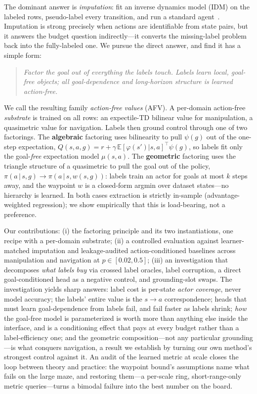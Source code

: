 \documentclass{article}
\newcommand{\E}{\mathbb{E}}
\theoremstyle{plain}
\theoremstyle{definition}
\begin{document}
The dominant answer is \emph{imputation}: fit an inverse dynamics model (IDM) on the labeled rows, pseudo-label every transition, and run a standard agent~\citep{ssorl}. Imputation is strong precisely when actions are identifiable from state pairs, but it answers the budget question indirectly---it converts the missing-label problem back into the fully-labeled one. We pursue the direct answer, and find it has a simple form:

\begin{quote}
\emph{Factor the goal out of everything the labels touch. Labels learn local, goal-free objects; all goal-dependence and long-horizon structure is learned action-free.}
\end{quote}

We call the resulting family \emph{action-free values} (AFV). A per-domain action-free \emph{substrate} is trained on all rows: an expectile-TD bilinear value for manipulation, a quasimetric value for navigation. Labels then ground control through one of two factorings. The \textbf{algebraic} factoring uses bilinearity to pull $\psi(g)$ out of the one-step expectation, $Q(s,a,g)=r+\gamma\,\E[\varphi(s')|s,a]^{\!\top}\psi(g)$, so labels fit only the goal-\emph{free} expectation model $\mu(s,a)$. The \textbf{geometric} factoring uses the triangle structure of a quasimetric to pull the goal out of the policy, $\pi(a\,|\,s,g)\rightarrow\pi(a\,|\,s,w(s,g))$: labels train an actor for goals at most $k$ steps away, and the waypoint $w$ is a closed-form argmin over dataset states---no hierarchy is learned. In both cases extraction is strictly in-sample (advantage-weighted regression); we show empirically that this is load-bearing, not a preference.

Our contributions: (i) the factoring principle and its two instantiations, one recipe with a per-domain substrate; (ii) a controlled evaluation against learner-matched imputation and leakage-audited action-conditioned baselines across manipulation and navigation at $p\in[0.02,0.5]$; (iii) an investigation that decomposes \emph{what labels buy} via crossed label oracles, label corruption, a direct goal-conditioned head as a negative control, and grounding-slot swaps. The investigation yields sharp answers: label cost is per-state \emph{actor coverage}, never model accuracy; the labels' entire value is the $s\!\to\!a$ correspondence; heads that must learn goal-dependence from labels fail, and fail faster as labels shrink; \emph{how} the goal-free model is parameterized is worth more than anything else inside the interface, and is a conditioning effect that pays at every budget rather than a label-efficiency one; and the geometric composition---not any particular grounding---is what conquers navigation, a result we establish by turning our own method's strongest control against it. An audit of the learned metric at scale closes the loop between theory and practice: the waypoint bound's assumptions name what fails on the large maze, and restoring them---a per-scale ring, short-range-only metric queries---turns a bimodal failure into the best number on the board.
\end{document}
